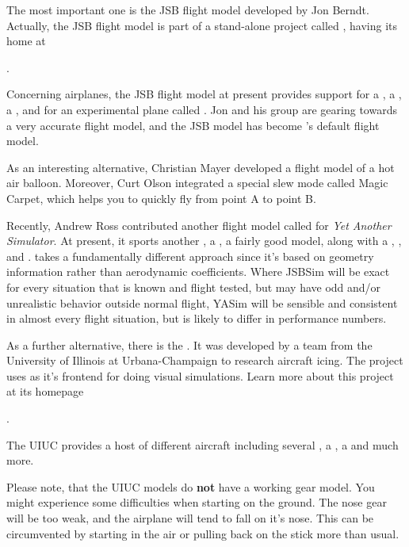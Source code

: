 The most important one is the JSB flight model developed by Jon Berndt. Actually, the JSB
flight model is part of a stand-alone project called \JSBSim, having its home at
 \medskip

.
 \medskip

 \noindent
Concerning airplanes, the JSB flight model at present provides support for a
, a , a , and for an experimental plane
called . Jon and his group are gearing towards a very accurate flight model, and the
JSB model has become \FlightGear{}'s default flight model.

As an interesting alternative, Christian Mayer developed a flight model of a hot air
balloon. Moreover, Curt Olson integrated a special slew mode called Magic Carpet, which
helps you to quickly fly from point A to point B.

Recently, Andrew Ross contributed another flight model called \YASim{} for
\textit{Yet Another Simulator}. At present, it sports another , a
, a fairly good  model, along with a ,
, and . \YASim{} takes a fundamentally different approach since it's
based on geometry information rather than aerodynamic coefficients. Where JSBSim will be exact
for every situation that is known and flight tested, but may have odd and/or unrealistic behavior
outside normal flight, YASim will be sensible and consistent in almost every flight situation,
but is likely to differ in performance numbers.

As a further alternative, there is the . It was developed by a team from
the University of Illinois at Urbana-Champaign to research aircraft icing.  The project
uses \FlightGear{} as it's frontend for doing visual simulations.  Learn more about this project
at its homepage
 \medskip

.
 \medskip

 \noindent
The UIUC provides a host of different aircraft including several , a
, a  and much more.

Please note, that the UIUC models do \textbf{not} have a working gear model. You might experience
some difficulties when starting on the ground.  The nose gear will be too weak, and the airplane
will tend to fall on it's nose. This can be circumvented by starting in the air or pulling back
on the stick more than usual.

